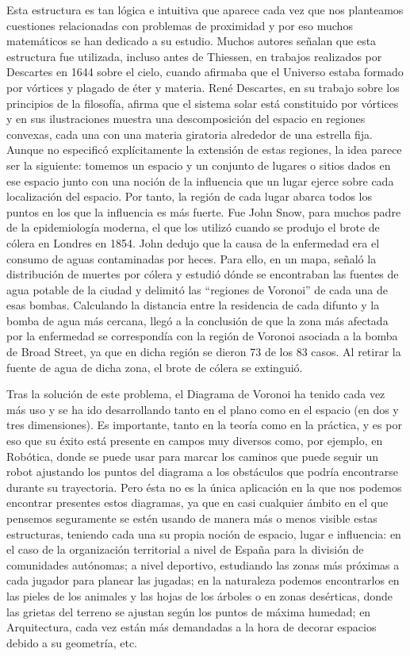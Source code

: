  Esta estructura es tan lógica e intuitiva que aparece cada vez que nos planteamos cuestiones relacionadas con problemas de proximidad y por eso muchos matemáticos se han dedicado a su estudio. Muchos autores señalan que esta estructura fue utilizada, incluso antes de Thiessen, en trabajos realizados por Descartes en 1644 sobre el cielo, cuando afirmaba que el Universo estaba formado por vórtices y plagado de éter y materia. René Descartes, en su trabajo sobre los principios de la filosofía, afirma que el sistema solar está constituido por vórtices y en sus ilustraciones muestra una descomposición del espacio en regiones convexas, cada una con una materia giratoria alrededor de una estrella fija. Aunque no especificó explícitamente la extensión de estas regiones, la idea parece ser la siguiente: tomemos un espacio y un conjunto de lugares o sitios dados en ese espacio junto con una noción de la influencia que un lugar ejerce sobre cada localización del espacio. Por tanto, la región de cada lugar abarca todos los puntos en los que la influencia es más fuerte. Fue John Snow, para muchos padre de la epidemiología moderna, el que los utilizó cuando se produjo el brote de cólera en Londres en 1854. John dedujo que la causa de la enfermedad era el consumo de aguas contaminadas por heces. Para ello, en un mapa, señaló la distribución de muertes por cólera y estudió dónde se encontraban las fuentes de agua potable de la ciudad y delimitó las “regiones de Voronoi” de cada una de esas bombas. Calculando la distancia entre la residencia de cada difunto y la bomba de agua más cercana, llegó a la conclusión de que la zona más afectada por la enfermedad se correspondía con la región de Voronoi asociada a la bomba de Broad Street, ya que en dicha región se dieron 73 de los 83 casos. Al retirar la fuente de agua de dicha zona, el brote de cólera se extinguió. 
 
 Tras la solución de este problema, el Diagrama de Voronoi ha tenido cada vez más uso y se ha ido desarrollando tanto en el plano como en el espacio (en dos y tres dimensiones). Es importante, tanto en la teoría como en la práctica, y es por eso que su éxito está presente en campos muy diversos como, por ejemplo, en Robótica, donde se puede usar para marcar los caminos que puede seguir un robot ajustando los puntos del diagrama a los obstáculos que podría encontrarse durante su trayectoria. Pero ésta no es la única aplicación en la que nos podemos encontrar presentes estos diagramas, ya que en casi cualquier ámbito en el que pensemos seguramente se estén usando de manera más o menos visible estas estructuras, teniendo cada una su propia noción de espacio, lugar e influencia: en el caso de la organización territorial a nivel de España para la división de comunidades autónomas; a nivel deportivo, estudiando las zonas más próximas a cada jugador para planear las jugadas; en la naturaleza podemos encontrarlos en las pieles de los animales y las hojas de los árboles o en zonas desérticas, donde las grietas del terreno se ajustan según los puntos de máxima humedad; en Arquitectura, cada vez están más demandadas a la hora de decorar espacios debido a su geometría, etc.
 

